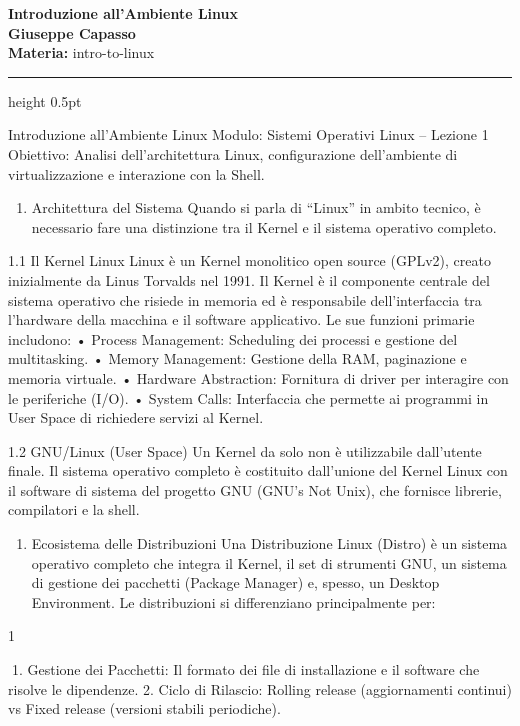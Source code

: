 \documentclass[11pt,a4paper]{article}
\providecommand{\tightlist}{%
  \setlength{\itemsep}{0pt}\setlength{\parskip}{0pt}}
\newcommand{\proposaltitle}[1]{
    \begin{center}
        \vspace*{0.1cm}
        {\LARGE \bfseries \color{blue} #1} \\[1.5ex]
        {\large \textbf{Giuseppe Capasso}} \\[1ex]
                \small{
            \vspace{0.1cm}
            \textbf{Materia:} intro-to-linux\\
        }
            \end{center}
    \vspace{0.3cm}
    \hrule height 0.5pt
    \vspace{0.5cm}
}
\begin{document}
\proposaltitle{Introduzione all'Ambiente Linux}

Introduzione all'Ambiente Linux Modulo: Sistemi Operativi Linux --
Lezione 1 Obiettivo: Analisi dell'architettura Linux, configurazione
dell'ambiente di virtualizzazione e interazione con la Shell.

\begin{enumerate}
\def\labelenumi{\arabic{enumi}.}
\tightlist
\item
  Architettura del Sistema Quando si parla di ``Linux'' in ambito
  tecnico, è necessario fare una distinzione tra il Kernel e il sistema
  operativo completo.
\end{enumerate}

1.1 Il Kernel Linux Linux è un Kernel monolitico open source (GPLv2),
creato inizialmente da Linus Torvalds nel 1991. Il Kernel è il
componente centrale del sistema operativo che risiede in memoria ed è
responsabile dell'interfaccia tra l'hardware della macchina e il
software applicativo. Le sue funzioni primarie includono: • Process
Management: Scheduling dei processi e gestione del multitasking. •
Memory Management: Gestione della RAM, paginazione e memoria virtuale. •
Hardware Abstraction: Fornitura di driver per interagire con le
periferiche (I/O). • System Calls: Interfaccia che permette ai programmi
in User Space di richiedere servizi al Kernel.

1.2 GNU/Linux (User Space) Un Kernel da solo non è utilizzabile
dall'utente finale. Il sistema operativo completo è costituito
dall'unione del Kernel Linux con il software di sistema del progetto GNU
(GNU's Not Unix), che fornisce librerie, compilatori e la shell.

\begin{enumerate}
\def\labelenumi{\arabic{enumi}.}
\setcounter{enumi}{1}
\tightlist
\item
  Ecosistema delle Distribuzioni Una Distribuzione Linux (Distro) è un
  sistema operativo completo che integra il Kernel, il set di strumenti
  GNU, un sistema di gestione dei pacchetti (Package Manager) e, spesso,
  un Desktop Environment. Le distribuzioni si differenziano
  principalmente per:
\end{enumerate}

1

1. Gestione dei Pacchetti: Il formato dei file di installazione e il
software che risolve le dipendenze. 2. Ciclo di Rilascio: Rolling
release (aggiornamenti continui) vs Fixed release (versioni stabili
periodiche).
\end{document}
